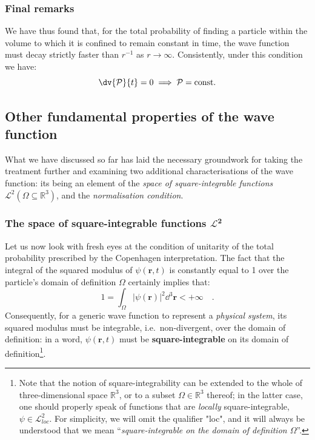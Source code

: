 \subsubsection{Final remarks}
We have thus found that, for the total probability of finding a particle within the volume to which it is confined to remain constant in time, the wave function must decay strictly faster than $r^{-1}$ as $r \to \infty$. Consistently, under this condition we have:
\[
    \dv{\mathcal{P}}{t} = 0 \implies \mathcal{P} = \text{const.}
\] 

\subsection{Other fundamental properties of the wave function}
What we have discussed so far has laid the necessary groundwork for taking the treatment further and examining two additional characterisations of the wave function: its being an element of the \textit{space of square-integrable functions} $\mathcal{L}^2(\Omega \subseteq \mathbb{R}^3)$, and the \textit{normalisation condition}.

\subsubsection{The space of square-integrable functions $\bm{\mathcal{L}^2}$}
Let us now look with fresh eyes at the condition of unitarity of the total probability prescribed by the Copenhagen interpretation. The fact that the integral of the squared modulus of $\psi(\bm{r},t)$ is constantly equal to 1 over the particle's domain of definition $\Omega$ certainly implies that:
\[
    1 = \int_\Omega |\psi(\bm{r})|^2 \dd^3{\bm{r}} < +\infty \quad.
\]
Consequently, for a generic wave function to represent a \emph{physical system}, its squared modulus must be integrable, i.e.\ non-divergent, over the domain of definition: in a word, $\psi(\bm{r},t)$ must be \textbf{square-integrable} on its domain of definition\footnote{Note that the notion of square-integrability can be extended to the whole of three-dimensional space $\mathbb{R}^3$, or to a subset $\Omega \in \mathbb{R}^3$ thereof; in the latter case, one should properly speak of functions that are \emph{locally} square-integrable, $\psi \in \mathcal{L}^2_{loc}$. For simplicity, we will omit the qualifier "loc", and it will always be understood that we mean ``\emph{square-integrable on the domain of definition $\Omega$}''.}.

